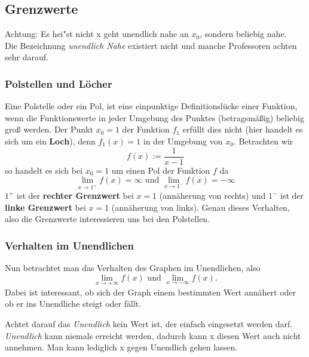 \subsection{Grenzwerte} \label{sec:grenzwerte}

\begin{warning}
	Achtung: Es hei"st nicht x geht unendlich nahe an $x_0$, sondern beliebig nahe.\\
	Die Bezeichnung \textit{unendlich Nahe} existiert nicht und manche Professoren achten sehr darauf.
\end{warning}

\subsubsection{Polstellen und Löcher}
Eine Polstelle oder ein Pol, ist eine einpunktige Definitionslücke einer Funktion, wenn die Funktionswerte in jeder Umgebung des Punktes (betragsmäßig) beliebig groß werden. Der Punkt $x_0 = 1$ der Funktion $f_1$ erfüllt dies nicht (hier handelt es sich um ein \textbf{Loch}), denn $f_1(x) = 1$ in der Umgebung von $x_0$. Betrachten wir 
\begin{equation*}
f(x) := \frac{1}{x-1}
\end{equation*}
so handelt es sich bei $x_0 = 1$ um einen Pol der Funktion $f$ da
\begin{equation*}
\lim\limits_{x \to 1^+} f(x) = \infty \text{ und } \lim\limits_{x \to 1^-} f(x) = -\infty
\end{equation*}
$1^+$ ist der \textbf{rechter Grenzwert} bei $x=1$ (annäherung von rechts) und $1^-$ ist der \textbf{linke Grenzwert} bei $x=1$ (annäherung von links). Genau dieses Verhalten, also die Grenzwerte interessieren uns bei den Polstellen.

\subsubsection{Verhalten im Unendlichen}
Nun betrachtet man das Verhalten des Graphen im Unendlichen, also
\begin{equation*}
\lim\limits_{x \to +\infty} f(x) \text{ und } \lim\limits_{x \to -\infty} f(x) .
\end{equation*}
 Dabei ist interessant, ob sich der Graph einem bestimmten Wert annähert oder ob er ins Unendliche steigt oder fällt.

\begin{warning}
	Achtet darauf das \textit{Unendlich} kein Wert ist, der einfach eingesetzt werden darf. \textit{Unendlich} kann niemals erreicht werden, dadurch kann x diesen Wert auch nicht annehmen. Man kann lediglich x gegen Unendlich gehen lassen.
\end{warning}

